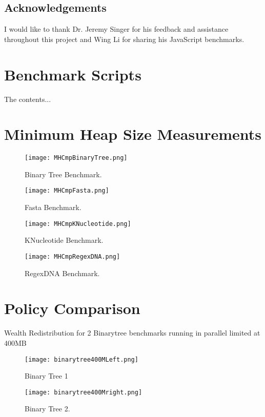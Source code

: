 \documentclass{l4proj}
\begin{document}
\section{Acknowledgements}
I would like to thank Dr. Jeremy Singer for his feedback and assistance throughout this project and Wing Li for sharing his JavaScript benchmarks.
\begin{appendices}
\chapter{Benchmark Scripts}
The contents...
\chapter{Minimum Heap Size Measurements}
\label{minheapsize}
\begin{figure}[!ht]
  \centering
    \texttt{[image: MHCmpBinaryTree.png]}
    \caption{Binary Tree Benchmark.}
\end{figure}

\begin{figure}[!ht]
  \centering
    \texttt{[image: MHCmpFasta.png]}
    \caption{Fasta Benchmark.}
\end{figure}

\begin{figure}[!ht]
  \centering
    \texttt{[image: MHCmpKNucleotide.png]}
    \caption{KNucleotide Benchmark.}
\end{figure}

\begin{figure}[!ht]
  \centering
    \texttt{[image: MHCmpRegexDNA.png]}
    \caption{RegexDNA Benchmark.}
\end{figure}
\chapter{Policy Comparison}
Wealth Redistribution for 2 Binarytree benchmarks running in parallel limited at 400MB
\begin{figure}[!ht]
  \centering
    \texttt{[image: binarytree400MLeft.png]}
    \caption{Binary Tree 1}
\end{figure}

\begin{figure}[!ht]
  \centering
    \texttt{[image: binarytree400Mright.png]}
    \caption{Binary Tree 2.}
\end{figure}

\end{appendices}
\end{document}
